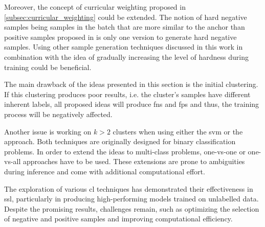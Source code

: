 Moreover, the concept of curricular weighting proposed in \autoref{subsec:curricular_weighting} could be extended.
The notion of hard negative samples being samples in the batch that are more similar to the anchor than positive samples 
proposed in \citet{curricular_weighting_2024} is only one version to generate hard negative samples.
Using other sample generation techniques discussed in this work in combination with 
the idea of gradually increasing the level of hardness during training could be beneficial.

The main drawback of the ideas presented in this section is the initial clustering.
If this clustering produces poor results, i.e. the cluster's samples have different inherent labels, 
all proposed ideas will produce \acp{fn} and \acp{fp} and thus, the training process will be negatively affected.

Another issue is working on $k>2$ clusters when using either the \ac{svm} or the \fisher{} approach.
Both techniques are originally designed for binary classification problems.
In order to extend the ideas to multi-class problems, one-vs-one or one-vs-all approaches have to be used. 
These extensions are prone to ambiguities during inference and 
come with additional computational effort.

The exploration of various \ac{cl} techniques has demonstrated their effectiveness in \ac{ssl}, 
particularly in producing high-performing models trained on unlabelled data. 
Despite the promising results, challenges remain, such as optimizing the selection of negative and positive samples 
and improving computational efficiency.